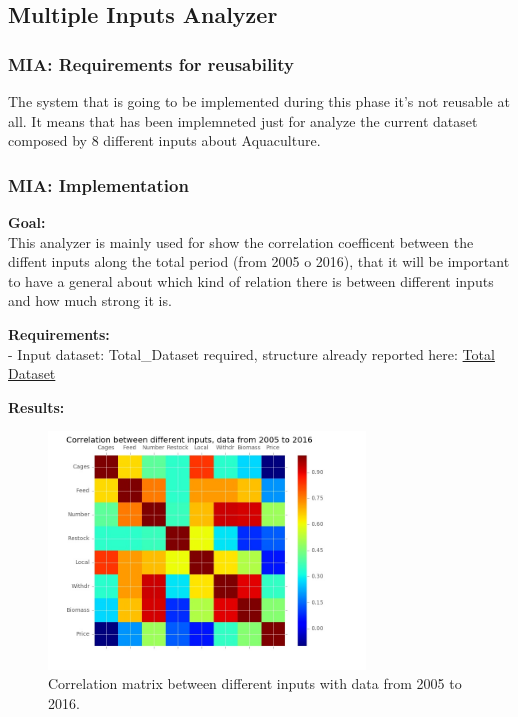 \newpage

\subsection{Multiple Inputs Analyzer}
\subsubsection{MIA: Requirements for reusability}
The system that is going to be implemented during this phase it's not reusable at all.
It means that has been implemneted just for analyze the current dataset composed by 8 different inputs about Aquaculture.

\subsubsection{MIA: Implementation}
\textbf{Goal:}\\
This analyzer is mainly used for show the correlation coefficent between the diffent inputs along the total period (from 2005 o 2016), that it will be important to have a general about which kind of relation there is between different inputs and how much strong it is.

\textbf{Requirements:}\\
- Input dataset: Total\_Dataset required, structure already reported here:
\hyperref[table: Total_Dataset]{Total Dataset}

\textbf{Results:} \\

\begin{figure}[H]
	\centering
    \includegraphics[width=0.75\textwidth]{Files/Total_Dataset_Years_Matrix.jpg}
    \caption{Correlation matrix between different inputs with data from 2005 to 2016.}
\end{figure}

